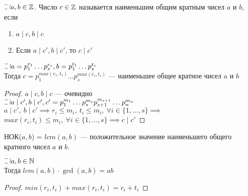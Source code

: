 \begin{normalsize}
\begin{defn}
    $\letus a, b \in \mathZ$. Число $c \in \mathbb{Z}$ называется наименьшим общим кратным чисел $a$ и $b$, если
    \begin{enumerate}
        \item $a \mid c, b \mid c$
        \item Если $a \mid c', b \mid c'$, то $c \mid c'$
    \end{enumerate}
\end{defn}

\begin{theorem-non}
    $\letus a = p_1^{r_1} \ldots p_s^{r_s}, b = p_1^{t_1} \ldots p_s^{t_s}$\\
    Тогда $c = p_1^{max(r_1, t_1)} \ldots p_s^{max(r_s, t_s)}$ --- наименьшее общее кратное чисел $a$ и $b$
\end{theorem-non}

\begin{proof}
    $a \mid c, b \mid c$ --- очевидно\\
    $\letus a \mid c', b \mid c', c' = p_1^{m_1} \ldots p_s^{m_s} p_{s+1}^{m_{s+1}} \ldots p_n^{m_n}$\\
    $a \mid c',~b \mid c' \implies r_i \leq m_i,~t_i \leq m_i,~\forall i \in \{1, \ldots, s\} \implies$\\
    $max(r_i, t_i) \leq m_i,~\forall i \in \{1, \ldots, s\} \implies c \mid c'$
\end{proof}

\begin{defn}
    НОК($a, b$) = $lcm(a, b)$ --- положительное значение наименьшего общего кратного чисел $a$ и $b$. 
\end{defn}

\begin{follow}
    $\letus a, b \in \mathN$\\
    Тогда $lcm(a, b) \cdot \gcd(a, b) = ab$
\end{follow}

\begin{proof}
    $min(r_i, t_i) + max(r_i, t_i) = r_i + t_i$
\end{proof}

\end{normalsize}